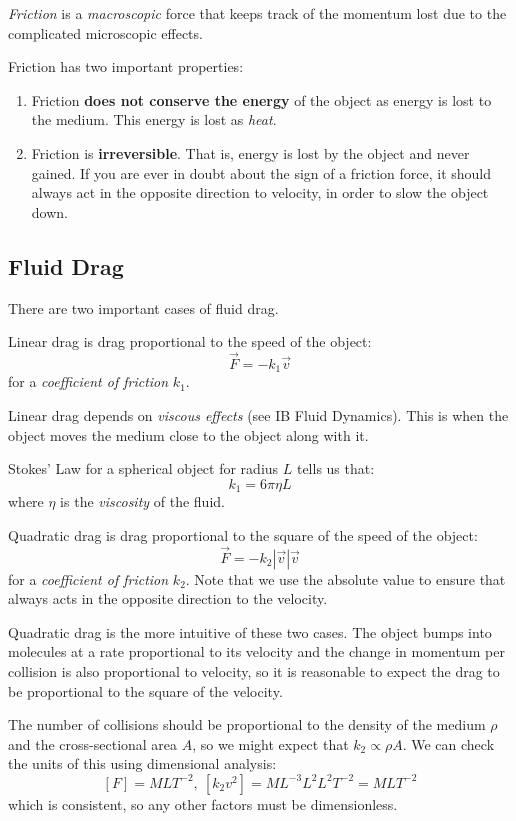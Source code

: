 \documentclass[../main.tex]{subfiles}
\begin{document}
\textit{Friction} is a \textit{macroscopic} force that keeps track of the momentum lost due to the complicated microscopic effects.

Friction has two important properties:
\begin{enumerate}
  \item Friction \textbf{does not conserve the energy} of the object as energy is lost to the medium.
    This energy is lost as \textit{heat}.
  \item Friction is \textbf{irreversible}.
    That is, energy is lost by the object and never gained.
    If you are ever in doubt about the sign of a friction force, it should always act in the opposite direction to velocity, in order to slow the object down.
\end{enumerate}
\subsection{Fluid Drag}
There are two important cases of fluid drag.
\begin{definition}
  Linear drag is drag proportional to the speed of the object:
  \[
    \vec{F} = -k_1 \vec{v}
  \]
  for a \textit{coefficient of friction} $k_1$.
\end{definition}
Linear drag depends on \textit{viscous effects} (see IB Fluid Dynamics).
This is when the object moves the medium close to the object along with it.

Stokes' Law for a spherical object for radius $L$ tells us that:
\[
  k_1 = 6\pi \eta L
\]
where $\eta$ is the \textit{viscosity} of the fluid.
\begin{definition}
  Quadratic drag is drag proportional to the square of the speed of the object:
  \[
    \vec{F} = -k_2 |\vec{v}|\vec{v}
  \]
  for a \textit{coefficient of friction} $k_2$.
  Note that we use the absolute value to ensure that always acts in the opposite direction to the velocity.
\end{definition}
Quadratic drag is the more intuitive of these two cases.
The object bumps into molecules at a rate proportional to its velocity and the change in momentum per collision is also proportional to velocity, so it is reasonable to expect the drag to be proportional to the square of the velocity.

The number of collisions should be proportional to the density of the medium $\rho$ and the cross-sectional area $A$, so we might expect that $k_2 \propto \rho A$.
We can check the units of this using dimensional analysis:
\[
  [F] = MLT^{-2},\ [k_2 v^2] = ML^{-3}L^2L^2T^{-2} = MLT^{-2}
\]
which is consistent, so any other factors must be dimensionless.
\end{document}
